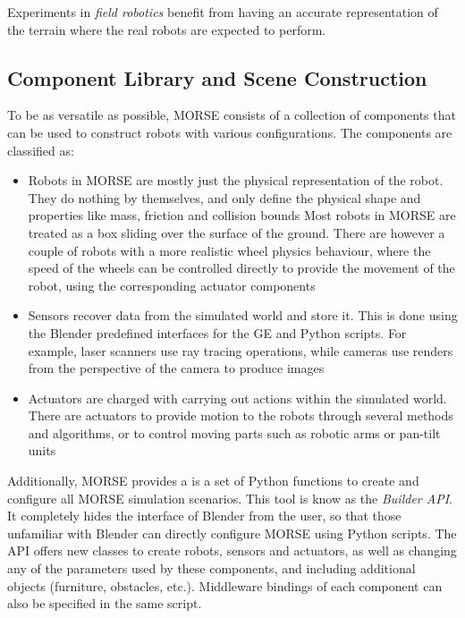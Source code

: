 \documentclass{llncs}
\begin{document}
Experiments in \emph{field robotics} benefit from having an accurate
representation of the terrain where the real robots are expected to perform.



\subsection{Component Library and Scene Construction}
\label{section:components}

To be as versatile as possible, MORSE consists of a collection of components
that can be used to construct robots with various configurations. The
components are classified as:

\begin{itemize}
  \item Robots in MORSE are mostly just the physical representation of the
    robot. They do nothing by themselves, and only define the physical shape
    and properties like mass, friction and collision bounds Most robots in
    MORSE are treated as a box sliding over the surface of the ground. There
    are however a couple of robots with a more realistic wheel physics
    behaviour, where the speed of the wheels can be controlled directly to
    provide the movement of the robot, using the corresponding actuator
    components
  \item Sensors recover data from the simulated world and store it. This is
    done using the Blender predefined interfaces for the GE and Python scripts.
    For example, laser scanners use ray tracing operations, while cameras use
    renders from the perspective of the camera to produce images
  \item Actuators are charged with carrying out actions within the simulated
    world. There are actuators to provide motion to the robots through several
    methods and algorithms, or to control moving parts such as robotic arms or
    pan-tilt units
\end{itemize}

%
%

Additionally, MORSE provides a is a set of Python functions to create and
configure all MORSE simulation scenarios. This tool is know as the
\emph{Builder API}. It completely hides the interface of Blender from the user,
so that those unfamiliar with Blender can directly configure MORSE using Python
scripts. The API offers new classes to create robots, sensors and actuators, as
well as changing any of the parameters used by these components, and including
additional objects (furniture, obstacles, etc.). Middleware bindings of
each component can also be specified in the same script.
\end{document}
